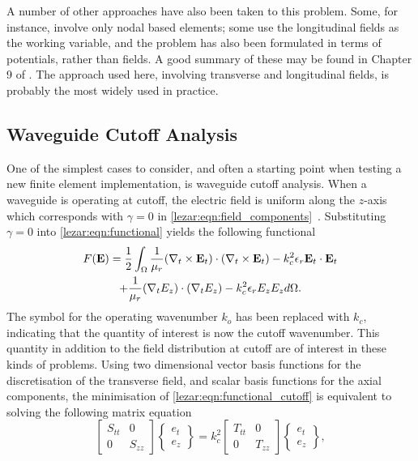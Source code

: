 A number of other approaches have also been taken to this
problem. Some, for instance, involve only nodal based elements; some
use the longitudinal fields as the working variable, and the problem
has also been formulated in terms of potentials, rather than fields. A
good summary of these may be found in Chapter 9 of \cite{ZhuCan2006}. The approach used here, involving transverse and
longitudinal fields, is probably the most widely used in practice.

\subsection{Waveguide Cutoff Analysis}
\label{lezar:sec:cutoff_formulation}
One of the simplest cases to consider, and often a starting point when
testing a new finite element implementation, is waveguide cutoff
analysis. When a waveguide is operating at cutoff, the electric field
is uniform along the $z$-axis which corresponds with $\gamma = 0$ in
\eqref{lezar:eqn:field_components}~\cite{Poz2005}.  Substituting $\gamma = 0$ into
\eqref{lezar:eqn:functional} yields the following functional
\begin{multline}
    \label{lezar:eqn:functional_cutoff}
    F(\mathbf{E}) = \frac{1}{2}\int_{\Omega}\frac{1}{\mu_r}(\curl{\mathbf{E}_t}{t})\cdot(\curl{\mathbf{E}_t}{t}) -k_c^2\epsilon_r\mathbf{E}_t\cdot{\mathbf{E}_t}\\
    +\frac{1}{\mu_r}(\nabla_t{E_z})\cdot(\nabla_t{E_z})
    -k_c^2\epsilon_r E_z{E_z} d\Omega.
\end{multline}
The symbol for the operating wavenumber
$k_o$ has been replaced with $k_c$, indicating that the
quantity of interest is now the cutoff
wavenumber. This quantity in addition to the
field distribution at cutoff are of interest in these kinds of
problems.  Using two dimensional vector basis functions for the
discretisation of the transverse field, and scalar basis functions for
the axial components, the minimisation of
\eqref{lezar:eqn:functional_cutoff} is equivalent to solving the following
matrix equation
\begin{equation}
    \label{lezar:eqn:matrix_equation_cutoff}
    \begin{bmatrix} S_{tt} & 0\\0 &
    S_{zz}\end{bmatrix}\begin{Bmatrix}e_t\\e_z\end{Bmatrix} =
    k_c^2\begin{bmatrix} T_{tt} & 0\\0 &
    T_{zz}\end{bmatrix}\begin{Bmatrix}e_t\\e_z\end{Bmatrix},
\end{equation}
